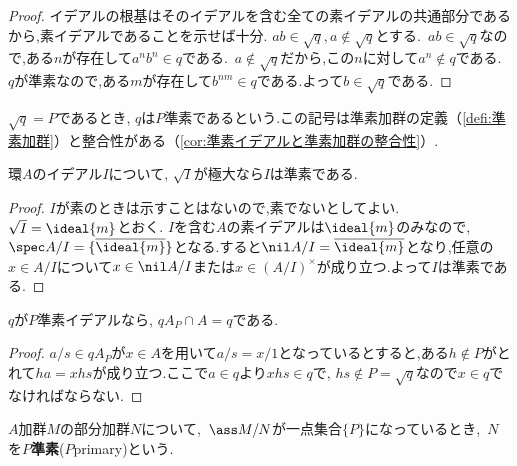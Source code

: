 \begin{proof}
	イデアルの根基はそのイデアルを含む全ての素イデアルの共通部分であるから,素イデアルであることを示せば十分. $ab\in\sqrt{ q},a\not\in\sqrt{ q}$とする.~$ab\in\sqrt{ q}$なので,ある$n$が存在して$a^nb^n\in q$である.~$a\not\in\sqrt{ q}$だから,この$n$に対して$a^n\not\in q$である.~$ q$が準素なので,ある$m$が存在して$b^{nm}\in q$である.よって$b\in\sqrt{ q}$である.
\end{proof}

$\sqrt{ q}= P$であるとき, $ q$は$ P$準素であるという.この記号は準素加群の定義（\ref{defi:準素加群}）と整合性がある（\ref{cor:準素イデアルと準素加群の整合性}）.

\begin{prop}\label{prop:sqrt{I}が極大なら準素}
	環$A$のイデアル$I$について, $\sqrt{I}$が極大なら$I$は準素である.
\end{prop}

\begin{proof}
	$I$が素のときは示すことはないので,素でないとしてよい. $\sqrt{I}=\ideal{m}$とおく. $I$を含む$A$の素イデアルは$\ideal{m}$のみなので, $\spec A/I=\{\bar{\ideal{m}}\}$となる.すると$\nil A/I=\bar{\ideal{m}}$となり,任意の$x\in A/I$について$x\in\nil A/I$または$x\in (A/I)^\times$が成り立つ.よって$I$は準素である.
\end{proof}

\begin{prop}
	$ q$が$ P$準素イデアルなら, $ qA_ P\cap A= q$である.
\end{prop}

\begin{proof}
	$a/s\in  qA_{ P}$が$x\in A$を用いて$a/s=x/1$となっているとすると,ある$h\not\in P$がとれて$ha=xhs$が成り立つ.ここで$a\in q$より$xhs\in q$で, $hs\not\in P=\sqrt{q}$なので$x\in q$でなければならない.
\end{proof}

\begin{defi}\label{defi:準素加群}
	$A$加群$M$の部分加群$N$について,~$\ass M/N$が一点集合$\{ P\}$になっているとき,~$N$を$ P$\textbf{準素}($ P$primary)という.
\end{defi}

